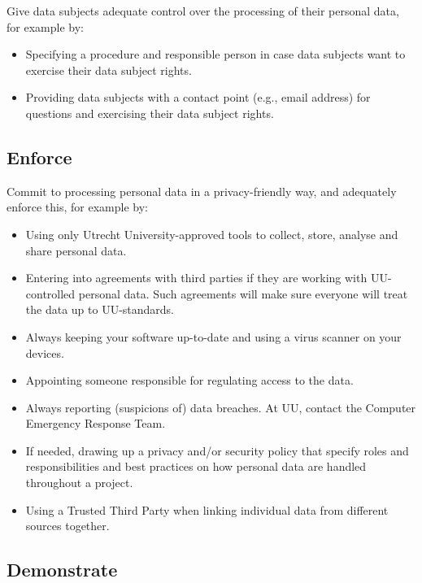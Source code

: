 \documentclass[
]{book}
\providecommand{\tightlist}{%
  \setlength{\itemsep}{0pt}\setlength{\parskip}{0pt}}
\begin{document}
Give data subjects adequate control over the processing of their personal data,
for example by:

\begin{itemize}
\tightlist
\item
  Specifying a procedure and responsible person in case data subjects want to
  exercise their data subject rights.
\item
  Providing data subjects with a contact point (e.g., email address) for
  questions and exercising their data subject rights.
\end{itemize}

\hypertarget{enforce}{%
\subsection{Enforce}\label{enforce}}

Commit to processing personal data in a privacy-friendly way, and adequately
enforce this, for example by:

\begin{itemize}
\tightlist
\item
  Using only
  Utrecht University-approved tools
  to collect, store, analyse and share
  personal data.
\item
  Entering into agreements with third parties if they
  are working with UU-controlled personal data. Such agreements will make sure
  everyone will treat the data up to UU-standards.
\item
  Always keeping your software up-to-date and using a virus scanner on your devices.
\item
  Appointing someone responsible for regulating access to the data.
\item
  Always reporting (suspicions of)
  data breaches.
  At UU, contact the Computer Emergency Response Team.
\item
  If needed, drawing up a privacy and/or security policy that specify roles and
  responsibilities and best practices on how personal data are handled throughout
  a project.
\item
  Using a Trusted Third Party when linking individual data from different
  sources together.
\end{itemize}

\hypertarget{demonstrate}{%
\subsection{Demonstrate}\label{demonstrate}}
\end{document}

